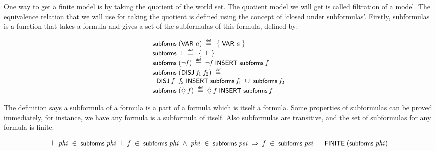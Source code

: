 \documentclass[letterpaper]{article}
\renewcommand{\HOLConst}[1]{{\textsf{\upshape\small #1}}}
\newenvironment{holmath}{\begin{displaymath}\begin{array}{l}}{\end{array}\end{displaymath}\ignorespacesafterend}
\begin{document}
One way to get a finite model is by taking the quotient of the world set. The quotient model we will get is called filtration of a model. The equivalence relation that we will use for taking the quotient is defined using the concept of `closed under subformulas'. Firstly, subformulas is a function that takes a formula and gives a set of the subformulas of this formula, defined by:

\begin{holmath}
  \HOLConst{subforms}\;(\HOLConst{VAR}\;\HOLFreeVar{a})\;\HOLSymConst{\HOLTokenDefEquality{}}\;\HOLTokenLeftbrace{}\HOLConst{VAR}\;\HOLFreeVar{a}\HOLTokenRightbrace{}\\
\HOLConst{subforms}\;\HOLSymConst{\ensuremath{\bot}}\;\HOLSymConst{\HOLTokenDefEquality{}}\;\HOLTokenLeftbrace{}\HOLSymConst{\ensuremath{\bot}}\HOLTokenRightbrace{}\\
\HOLConst{subforms}\;(\HOLSymConst{\HOLTokenNeg{}}\HOLFreeVar{f})\;\HOLSymConst{\HOLTokenDefEquality{}}\;\HOLSymConst{\HOLTokenNeg{}}\HOLFreeVar{f}\;\HOLConst{INSERT}\;\HOLConst{subforms}\;\HOLFreeVar{f}\\
\HOLConst{subforms}\;(\HOLConst{DISJ}\;\HOLFreeVar{f\sb{\mathrm{1}}}\;\HOLFreeVar{f\sb{\mathrm{2}}})\;\HOLSymConst{\HOLTokenDefEquality{}}\\
\;\;\HOLConst{DISJ}\;\HOLFreeVar{f\sb{\mathrm{1}}}\;\HOLFreeVar{f\sb{\mathrm{2}}}\;\HOLConst{INSERT}\;\HOLConst{subforms}\;\HOLFreeVar{f\sb{\mathrm{1}}}\;\HOLSymConst{\HOLTokenUnion{}}\;\HOLConst{subforms}\;\HOLFreeVar{f\sb{\mathrm{2}}}\\
\HOLConst{subforms}\;(\HOLSymConst{\ensuremath{\Diamond}}\;\HOLFreeVar{f})\;\HOLSymConst{\HOLTokenDefEquality{}}\;\HOLSymConst{\ensuremath{\Diamond}}\;\HOLFreeVar{f}\;\HOLConst{INSERT}\;\HOLConst{subforms}\;\HOLFreeVar{f}
\end{holmath}

The definition says a subformula of a formula is a part of a formula which is itself a formula. Some properties of subformulas can be proved immediately, for instance, we have any formula is a subformula of itself. Also subformulas are transitive, and the set of subformulas for any formula is finite. 

\begin{holmath}
  \ensuremath{\HOLTokenTurnstile}\HOLFreeVar{phi}\;\HOLSymConst{\HOLTokenIn{}}\;\HOLConst{subforms}\;\HOLFreeVar{phi}
  \ensuremath{\HOLTokenTurnstile}\HOLFreeVar{f}\;\HOLSymConst{\HOLTokenIn{}}\;\HOLConst{subforms}\;\HOLFreeVar{phi}\;\HOLSymConst{\HOLTokenConj{}}\;\HOLFreeVar{phi}\;\HOLSymConst{\HOLTokenIn{}}\;\HOLConst{subforms}\;\HOLFreeVar{psi}\;\HOLSymConst{\HOLTokenImp{}}\;\HOLFreeVar{f}\;\HOLSymConst{\HOLTokenIn{}}\;\HOLConst{subforms}\;\HOLFreeVar{psi}
  \ensuremath{\HOLTokenTurnstile}\HOLConst{FINITE}\;(\HOLConst{subforms}\;\HOLFreeVar{phi})
\end{holmath}
\end{document}
